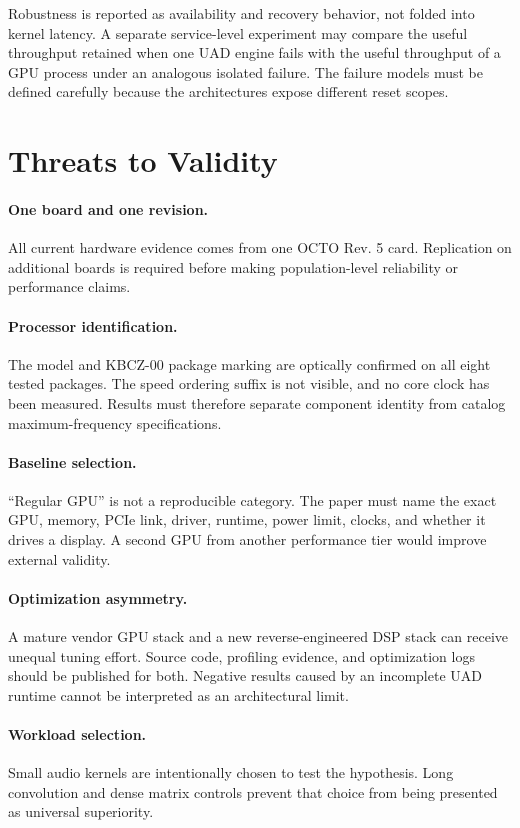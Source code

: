 \documentclass[10pt,twocolumn,twoside]{article}
\begin{document}
Robustness is reported as availability and recovery behavior, not folded into
kernel latency. A separate service-level experiment may compare the useful
throughput retained when one UAD engine fails with the useful throughput of a
GPU process under an analogous isolated failure. The failure models must be
defined carefully because the architectures expose different reset scopes.

\section{Threats to Validity}

\paragraph{One board and one revision.}
All current hardware evidence comes from one OCTO Rev. 5 card. Replication on
additional boards is required before making population-level reliability or
performance claims.

\paragraph{Processor identification.}
The model and KBCZ-00 package marking are optically confirmed on all eight
tested packages. The speed ordering suffix is not visible, and no core clock
has been measured. Results must therefore separate component identity from
catalog maximum-frequency specifications.

\paragraph{Baseline selection.}
``Regular GPU'' is not a reproducible category. The paper must name the exact
GPU, memory, PCIe link, driver, runtime, power limit, clocks, and whether it
drives a display. A second GPU from another performance tier would improve
external validity.

\paragraph{Optimization asymmetry.}
A mature vendor GPU stack and a new reverse-engineered DSP stack can receive
unequal tuning effort. Source code, profiling evidence, and optimization logs
should be published for both. Negative results caused by an incomplete UAD
runtime cannot be interpreted as an architectural limit.

\paragraph{Workload selection.}
Small audio kernels are intentionally chosen to test the hypothesis. Long
convolution and dense matrix controls prevent that choice from being presented
as universal superiority.
\end{document}
